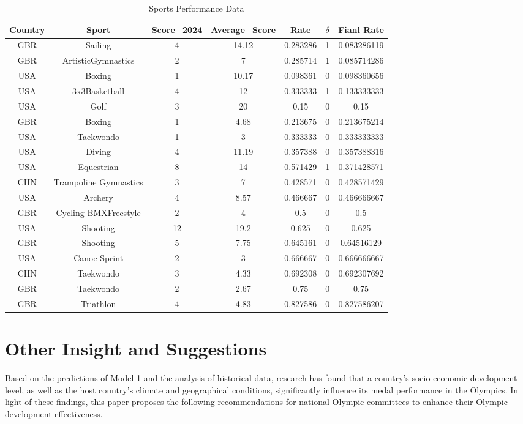 \documentclass[12pt]{article}
\begin{document}
\begin{table}[h!]
\caption{Sports Performance Data}
\centering
\begin{tabular}{ccccccc}
\toprule
Country & Sport & Score\_2024 & Average\_Score & Rate & $\delta$ & Fianl Rate \\
\midrule
GBR & Sailing & 4 & 14.12 & 0.283286 & 1 & 0.083286119 \\
GBR & ArtisticGymnastics & 2 & 7 & 0.285714 & 1 & 0.085714286 \\
USA & Boxing & 1 & 10.17 & 0.098361 & 0 & 0.098360656 \\
USA & 3x3Basketball & 4 & 12 & 0.333333 & 1 & 0.133333333 \\
USA & Golf & 3 & 20 & 0.15 & 0 & 0.15 \\
GBR & Boxing & 1 & 4.68 & 0.213675 & 0 & 0.213675214 \\
USA & Taekwondo & 1 & 3 & 0.333333 & 0 & 0.333333333 \\
USA & Diving & 4 & 11.19 & 0.357388 & 0 & 0.357388316 \\
USA & Equestrian & 8 & 14 & 0.571429 & 1 & 0.371428571 \\
CHN & Trampoline Gymnastics & 3 & 7 & 0.428571 & 0 & 0.428571429 \\
USA & Archery & 4 & 8.57 & 0.466667 & 0 & 0.466666667 \\
GBR & Cycling BMXFreestyle & 2 & 4 & 0.5 & 0 & 0.5 \\
USA & Shooting & 12 & 19.2 & 0.625 & 0 & 0.625 \\
GBR & Shooting & 5 & 7.75 & 0.645161 & 0 & 0.64516129 \\
USA & Canoe Sprint & 2 & 3 & 0.666667 & 0 & 0.666666667 \\
CHN & Taekwondo & 3 & 4.33 & 0.692308 & 0 & 0.692307692 \\
GBR & Taekwondo & 2 & 2.67 & 0.75 & 0 & 0.75 \\
GBR & Triathlon & 4 & 4.83 & 0.827586 & 0 & 0.827586207 \\
\bottomrule
\end{tabular}
\label{tab:sports_data}
\end{table}

\section{Other Insight and Suggestions}

\quad \quad Based on the predictions of Model 1 and the analysis of historical data, research has found that a country's socio-economic development level, as well as the host country's climate and geographical conditions, significantly influence its medal performance in the Olympics. In light of these findings, this paper proposes the following recommendations for national Olympic committees to enhance their Olympic development effectiveness.\\
\end{document}
